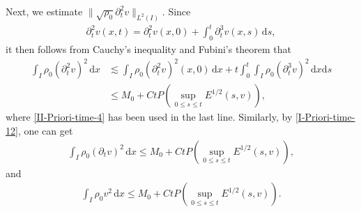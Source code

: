 \documentclass[11pt, reqno]{amsart}
\newcommand{\diff}{\mathrm{d}}
\numberwithin{equation}{section}
\begin{document}
Next, we estimate \(\|\sqrt{\rho_0}\partial_t^2v\|_{L^2(I)}\). Since
\begin{equation*}
\begin{aligned}
\partial_t^2v(x,t)=\partial_t^2v(x,0)+\int_0^t\partial_t^3v(x,s)\,\diff s,
\end{aligned}
\end{equation*}
it then follows from Cauchy's inequality and Fubini's theorem that
\begin{equation}\label{I-Priori-time-12}
\begin{aligned}
\int_I \rho_0(\partial_t^2v)^2\,\diff x
&\lesssim \int_I \rho_0(\partial_t^2v)^2(x,0)\,\diff x
+t\int_0^t\int_I \rho_0(\partial_t^3v)^2\,\diff x\diff s\\
&\leq M_0+Ct P(\sup_{0\leq s\leq t}E^{1/2}(s,v)),
\end{aligned}
\end{equation}
where \eqref{II-Priori-time-4} has been used in the last line. Similarly, by \eqref{I-Priori-time-12}, one can get
\begin{equation}\label{I-Priori-time-8}
\begin{aligned}
\int_I \rho_0(\partial_tv)^2\,\diff x
\leq M_0+Ct P(\sup_{0\leq s\leq t}E^{1/2}(s,v)),
\end{aligned}
\end{equation}
and
\begin{equation}\label{I-Priori-time-3}
\begin{aligned}
\int_I \rho_0v^2\,\diff x
\leq M_0+Ct P(\sup_{0\leq s\leq t}E^{1/2}(s,v)).
\end{aligned}
\end{equation}
\end{document}
